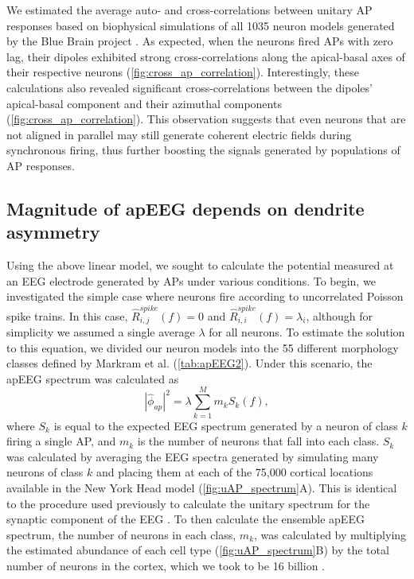 We estimated the average auto- and cross-correlations between unitary AP responses based on biophysical simulations of all 1035 neuron models generated by the Blue Brain project \cite{Markram2015}. As expected, when the neurons fired APs with zero lag, their dipoles exhibited strong cross-correlations along the apical-basal axes of their respective neurons ({\autoref{fig:cross_ap_correlation}}). Interestingly, these calculations also revealed significant cross-correlations between the dipoles' apical-basal component and their azimuthal components ({\autoref{fig:cross_ap_correlation}}). This observation suggests that even neurons that are not aligned in parallel may still generate coherent electric fields during synchronous firing, thus further boosting the signals generated by populations of AP responses.

\subsection{Magnitude of apEEG depends on dendrite asymmetry}
Using the above linear model, we sought to calculate the potential measured at an EEG electrode generated by APs under various conditions. To begin, we investigated the simple case where neurons fire according to uncorrelated Poisson spike trains. In this case, $\hat{R}_{i,j}^{spike}(f)=0$ and $\hat{R}_{i,i}^{spike}(f)=\lambda_i$, although for simplicity we assumed a single average $\lambda$ for all neurons. To estimate the solution to this equation, we divided our neuron models into the 55 different morphology classes defined by Markram et al. \cite{Markram2015} (\autoref{tab:apEEG2}). Under this scenario, the apEEG spectrum was calculated as
\begin{equation} \label{eq:apEEG_spectrum_linear}
    |\hat{\phi}_{ap}|^2 = \lambda \sum_{k=1}^M m_k S_k(f),
\end{equation}
where $S_k$ is equal to the expected EEG spectrum generated by a neuron of class $k$ firing a single AP, and $m_k$ is the number of neurons that fall into each class. $S_k$ was calculated by averaging the EEG spectra generated by simulating many neurons of class $k$ and placing them at each of the 75,000 cortical locations available in the New York Head model \cite{Huang2016} ({\autoref{fig:uAP_spectrum}A}). This is identical to the procedure used previously to calculate the unitary spectrum for the synaptic component of the EEG \cite{Brake2024}. To then calculate the ensemble apEEG spectrum, the number of neurons in each class, $m_k$, was calculated by multiplying the estimated abundance of each cell type \cite{Markram2015} ({\autoref{fig:uAP_spectrum}B}) by the total number of neurons in the cortex, which we took to be 16 billion \cite{Azevedo2009}.

